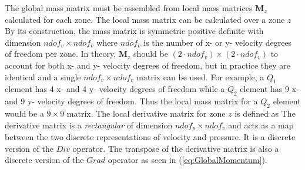 The global mass matrix must be assembled from local mass matrices $\mathbf{M}_z$ calculated for each zone. The local mass matrix can be calculated over a zone $z$
By its construction, the mass matrix is symmetric positive definite with dimension $ndof_v \times ndof_v$ where $ndof_v$ is the number of x- or y- velocity degrees of freedom per zone. In theory, $\mathbf{M}_z$ should be $(2 \cdot ndof_v) \times (2 \cdot ndof_v)$ to account for both x- and y- velocity degrees of freedom, but in practice they are identical and a single $ndof_v \times ndof_v$ matrix can be used. For example, a $Q_1$ element has 4 x- and 4 y- velocity degrees of freedom while a $Q_2$ element has 9 x- and 9 y- velocity degrees of freedom. Thus the local mass matrix for a $Q_2$ element would be a $9 \times 9$ matrix. 
The local derivative matrix for zone $z$ is defined as
The derivative matrix is a \emph{rectangular} of dimension $ndof_p \times ndof_v$ and acts as a map between the two discrete representations of velocity and pressure. It is a discrete version of the $Div$ operator. The transpose of the derivative matrix is also a discrete version of the $Grad$ operator as seen in (\ref{eq:GlobalMomentum}).

